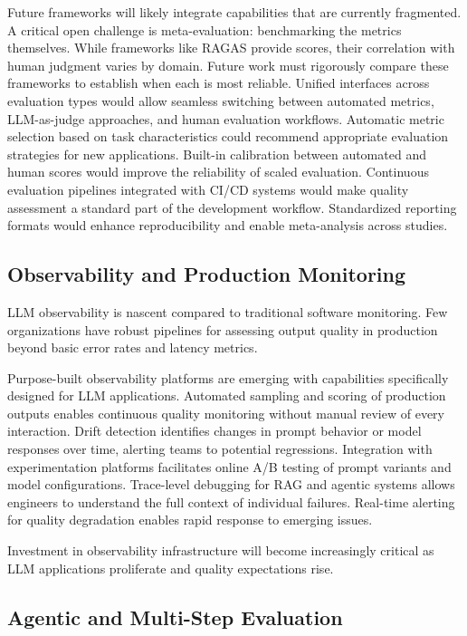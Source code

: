 Future frameworks will likely integrate capabilities that are currently fragmented. A critical open challenge is meta-evaluation: benchmarking the metrics themselves. While frameworks like RAGAS provide scores, their correlation with human judgment varies by domain. Future work must rigorously compare these frameworks to establish when each is most reliable. Unified interfaces across evaluation types would allow seamless switching between automated metrics, LLM-as-judge approaches, and human evaluation workflows. Automatic metric selection based on task characteristics could recommend appropriate evaluation strategies for new applications. Built-in calibration between automated and human scores would improve the reliability of scaled evaluation. Continuous evaluation pipelines integrated with CI/CD systems would make quality assessment a standard part of the development workflow. Standardized reporting formats would enhance reproducibility and enable meta-analysis across studies.

\subsection{Observability and Production Monitoring}

LLM observability is nascent compared to traditional software monitoring. Few organizations have robust pipelines for assessing output quality in production beyond basic error rates and latency metrics.

Purpose-built observability platforms are emerging with capabilities specifically designed for LLM applications. Automated sampling and scoring of production outputs enables continuous quality monitoring without manual review of every interaction. Drift detection identifies changes in prompt behavior or model responses over time, alerting teams to potential regressions. Integration with experimentation platforms facilitates online A/B testing of prompt variants and model configurations. Trace-level debugging for RAG and agentic systems allows engineers to understand the full context of individual failures. Real-time alerting for quality degradation enables rapid response to emerging issues.

Investment in observability infrastructure will become increasingly critical as LLM applications proliferate and quality expectations rise.

\subsection{Agentic and Multi-Step Evaluation}

